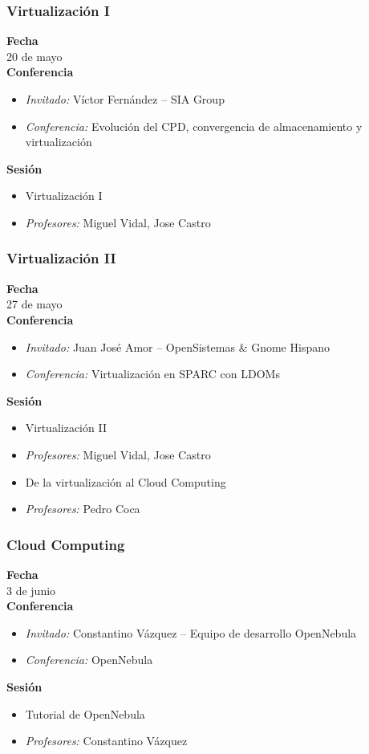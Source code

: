 \documentclass{beamer}
\begin{document}
\begin{frame}
  \frametitle{Virtualización I}
  \textbf{Fecha}\\
    20 de mayo\\
  \textbf{Conferencia}
    \begin{itemize}
      \item \textit{Invitado:} Víctor Fernández -- SIA Group
      \item \textit{Conferencia:} Evolución del CPD, convergencia de almacenamiento y virtualización
    \end{itemize}
  \textbf{Sesión}
    \begin{itemize}
      \item Virtualización I
      \item \textit{Profesores:} Miguel Vidal, Jose Castro
    \end{itemize}
\end{frame}

\begin{frame}
  \frametitle{Virtualización II}
  \textbf{Fecha}\\
    27 de mayo\\
  \textbf{Conferencia}
    \begin{itemize}
      \item \textit{Invitado:} Juan José Amor -- OpenSistemas \& Gnome Hispano
      \item \textit{Conferencia:} Virtualización en SPARC con LDOMs
    \end{itemize}
  \textbf{Sesión}
    \begin{itemize}
      \item Virtualización II
      \item \textit{Profesores:} Miguel Vidal, Jose Castro
    \end{itemize}
    \begin{itemize}
      \item De la virtualización al Cloud Computing
      \item \textit{Profesores:} Pedro Coca
    \end{itemize}
\end{frame}

\begin{frame}
  \frametitle{Cloud Computing}
  \textbf{Fecha}\\
    3 de junio\\
  \textbf{Conferencia}
    \begin{itemize}
      \item \textit{Invitado:} Constantino Vázquez -- Equipo de desarrollo OpenNebula
      \item \textit{Conferencia:} OpenNebula
    \end{itemize}
  \textbf{Sesión}
    \begin{itemize}
      \item Tutorial de OpenNebula
      \item \textit{Profesores:} Constantino Vázquez
    \end{itemize}
\end{frame}
\end{document}
